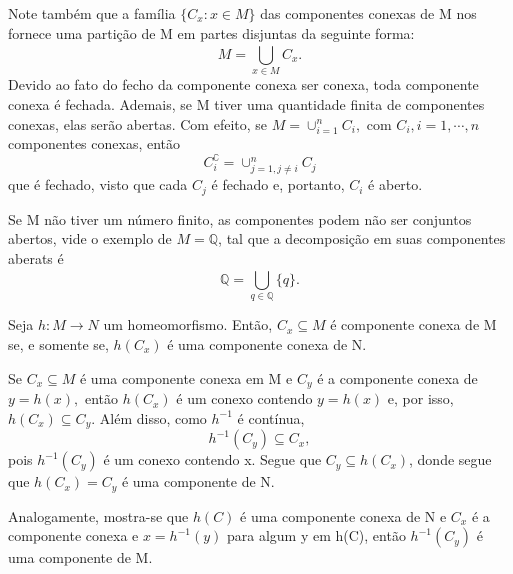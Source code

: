 \documentclass[metric_notes.tex]{subfiles}
\begin{document}
Note também que a família \(\{C_{x}: x\in M\}\) das componentes conexas de M nos fornece uma partição de M
em partes disjuntas da seguinte forma:
\[
	M = \bigcup_{x\in M}^{}{C_{x}}.
\]
Devido ao fato do fecho da componente conexa ser conexa, toda componente conexa é fechada. Ademais, se M tiver uma quantidade finita de componentes conexas,
elas serão abertas. Com efeito, se \(M = \cup_{i=1}^{n}C_{i},\) com \(C_{i}, i = 1,\cdots,n\) componentes conexas, então
\[
	C_{i}^{\complement} = \cup_{j=1, j\neq i}^{n}C_{j}
\]
que é fechado, visto que cada \(C_{j}\) é fechado e, portanto, \(C_{i}\) é aberto.
\begin{example}
	Se M não tiver um número finito, as componentes podem não ser conjuntos abertos, vide o exemplo de \(M = \mathbb{Q}\), tal que a decomposição em suas componentes aberats é
	\[
		\mathbb{Q} = \bigcup_{q\in \mathbb{Q}}^{}{\{q\}}.
	\]
\end{example}
\begin{theorem*}
	Seja \(h:M\rightarrow N\) um homeomorfismo. Então, \(C_{x}\subseteq{M}\) é componente conexa de M se, e somente se,
	\(h(C_{x})\) é uma componente conexa de N.
\end{theorem*}
\begin{proof*}
	Se \(C_{x}\subseteq{M}\) é uma componente conexa em M e \(C_{y}\) é a componente conexa de \(y=h(x),\) então \(h(C_{x})\) é
	um conexo contendo \(y = h(x)\) e, por isso, \(h(C_{x})\subseteq{C_{y}}\). Além disso, como \(h^{-1}\) é contínua,
	\[
		h^{-1}(C_{y})\subseteq{C_{x}},
	\]
	pois \(h^{-1}(C_{y})\) é um conexo contendo x. Segue que \(C_{y}\subseteq{h(C_{x})}\), donde segue que \(h(C_{x}) = C_{y}\) é
	uma componente de N.

	Analogamente, mostra-se que \(h(C)\) é uma componente conexa de N e \(C_{x}\) é a componente conexa e \(x=h^{-1}(y)\) para algum y em h(C), então
	\(h^{-1}(C_{y})\) é uma componente de M. \qedsymbol
\end{proof*}
\end{document}
